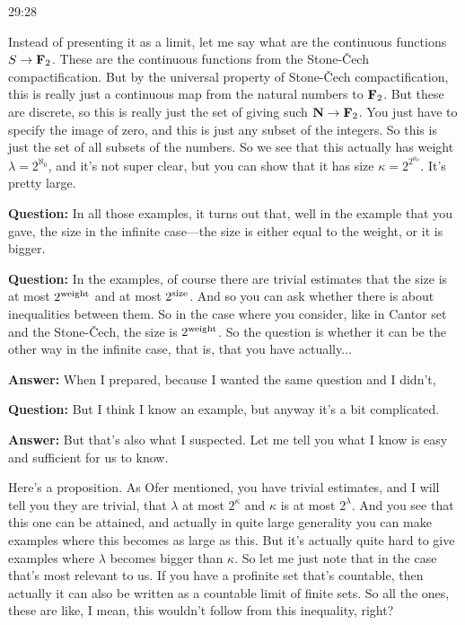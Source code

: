 \begin{example}
\begin{unfinished}{29:28}

Instead of presenting it as a limit, let me say what are the continuous functions $S \to \mathbf F_2$. These are the continuous functions from the Stone-Čech compactification. But by the universal property of Stone-Čech compactification, this is really just a continuous map from the natural numbers to $\mathbf F_2$. But these are discrete, so this is really just the set of giving such $\mathbf N \to \mathbf F_2$. You just have to specify the image of zero, and this is just any subset of the integers. So this is just the set of all subsets of the numbers.
So we see that this actually has weight $\lambda = 2^{\aleph_0}$, and it's not super clear, but you can show that it has size $\kappa = 2^{2^{\aleph_0}}$. It's pretty large. 

\textbf{Question:} In all those examples, it turns out that, well in the example that you gave, the size in the infinite case---the size is either equal to the weight, or it is bigger.


\textbf{Question:} In the examples, of course there are trivial estimates that the size is at most $2^{\mathrm{weight}}$ and at most $2^{\mathrm{size}}$. And so you can ask whether there is about inequalities between them. So in the case where you consider, like in Cantor set and the Stone-Čech, the size is $2^{\mathrm{weight}}$. So the question is whether it can be the other way in the infinite case, that is, that you have actually...
 
\textbf{Answer:} When I prepared, because I wanted the same question and I didn't, 

\textbf{Question:} But I think I know an example, but anyway it's a bit complicated. 

\textbf{Answer:} But that's also what I suspected.
Let me tell you what I know is easy and sufficient for us to know. 

\begin{proposition}

Here's a proposition. As Ofer mentioned, you have trivial estimates, and I will tell you they are trivial, that $\lambda$ at most $2^{\kappa}$ and $\kappa$ is at most $2^{\lambda}$. And you see that this one can be attained, and actually in quite large generality you can make examples where this becomes as large as this. 
But it's actually quite hard to give examples where $\lambda$ becomes bigger than $\kappa$.
So let me just note that in the case that's most relevant to us. 
If you have a profinite set that's countable, then actually it can also be written as a countable limit of finite sets. So all the ones, these are like, I mean, this wouldn't follow from this inequality, right?


\end{proposition}
\end{unfinished}
\end{example}
